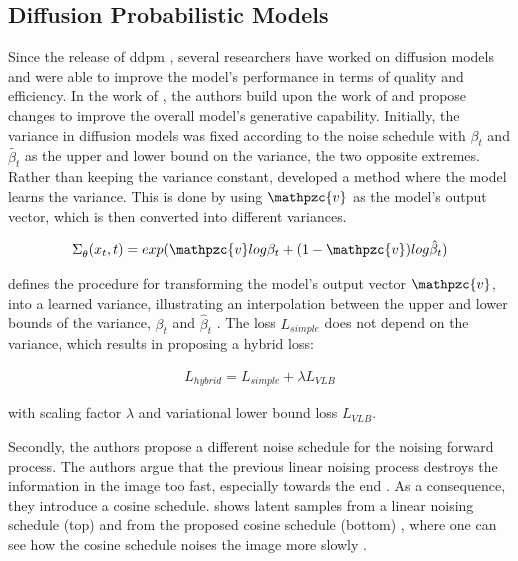 \subsection{Diffusion Probabilistic Models}
\label{ch:preliminaries-diffusionProbabilisticModelsTabularData}

Since the release of \gls{ddpm} \cite{ho2020DenoisingDiffusionProbabilistic}, several researchers have worked on diffusion models and were able to improve the \gls{model}'s performance in terms of quality and efficiency.
In the work of \textcite{nichol2021ImprovedDenoisingDiffusion}, the authors build upon the work of \textcite{ho2020DenoisingDiffusionProbabilistic} and propose changes to improve the overall \gls{model}'s generative capability.
Initially, the variance in diffusion models was fixed according to the noise schedule with $\beta_t$ and $\tilde{\beta_t}$ as the upper and lower bound on the variance, the two opposite extremes.
Rather than keeping the variance constant, \textcite{nichol2021ImprovedDenoisingDiffusion} developed a method where the \gls{model} learns the variance. 
This is done by using $\mathpzc{v}$ as the \gls{model}'s output vector, which is then converted into different variances.

\begin{equation}
    \label{eqn:impr_diff}
    \begin{align*}
        \Sigma_{\theta}^{}(x_t,t)=exp(\mathpzc{v}log\beta_t+(1-\mathpzc{v})log\hat{\beta}_t)
    \end{align*}
\end{equation}

 defines the procedure for transforming the \gls{model}'s output vector $\mathpzc{v}$, into a learned variance, illustrating an interpolation between the upper and lower bounds of the variance, $\beta_t$ and $\hat{\beta}_t$ \cite{nichol2021ImprovedDenoisingDiffusion}.
The loss $L_{simple}$ does not depend on the variance, which results in \cite{nichol2021ImprovedDenoisingDiffusion} proposing a hybrid loss:

\begin{equation}
    \label{eqn:l_hybrid}
    \begin{align*}
        L_{hybrid} =L_{simple}+\lambda L_{VLB}
    \end{align*}
\end{equation}

with scaling factor $\lambda$ and variational lower bound loss $L_{VLB}$.

Secondly, the authors propose a different noise schedule for the noising forward process.
The authors argue that the previous linear noising process destroys the information in the image too fast, especially towards the end \cite{nichol2021ImprovedDenoisingDiffusion}.
As a consequence, they introduce a cosine schedule.
 shows latent samples from a linear noising schedule (top) and from the proposed cosine schedule (bottom) \cite[Figure 3, p. 4]{nichol2021ImprovedDenoisingDiffusion}, where one can see how the cosine schedule noises the image more slowly \cite{nichol2021ImprovedDenoisingDiffusion}.

